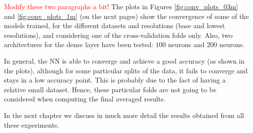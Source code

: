 \textcolor{red}{Modify these two paragraphs a bit!}
The plots in Figures \ref{fig:conv_plots_03m} and \ref{fig:conv_plots_1m} (on the next pages) show the convergence of some of the models trained, for the different datasets and resolutions (base and lowest resolutions), and considering one of the cross-validation folds only. Also, two architectures for the dense layer have been tested: $100$ neurons and $200$ neurons. 

In general, the NN is able to converge and achieve a good accuracy (as shown in the plots), although for some particular splits of the data, it fails to converge and stays in a low accuracy point. This is probably due to the fact of having a relative small dataset. Hence, these particular folds are not going to be considered when computing the final averaged results.

In the next chapter we discuss in much more detail the results obtained from all these experiments.

